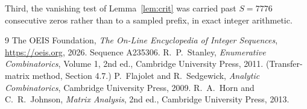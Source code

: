\documentclass[11pt,a4paper]{article}
\theoremstyle{plain}
\theoremstyle{definition}
\begin{document}
Third, the vanishing test of Lemma~\ref{lem:crit} was carried past $S=7776$ consecutive
zeros rather than to a sampled prefix, in exact integer arithmetic.

\begin{thebibliography}{9}
 The OEIS Foundation, \emph{The On-Line Encyclopedia of Integer
Sequences}, \url{https://oeis.org}, 2026. Sequence A235306.
 R.~P.~Stanley, \emph{Enumerative Combinatorics}, Volume 1, 2nd ed.,
Cambridge University Press, 2011. (Transfer-matrix method, Section 4.7.)
 P.~Flajolet and R.~Sedgewick, \emph{Analytic Combinatorics}, Cambridge
University Press, 2009.
 R.~A.~Horn and C.~R.~Johnson, \emph{Matrix Analysis}, 2nd ed., Cambridge
University Press, 2013.
\end{thebibliography}
\end{document}
